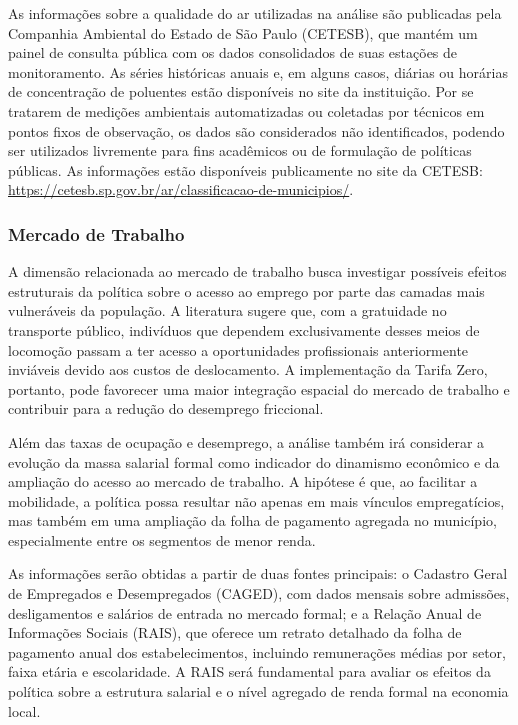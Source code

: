 As informações sobre a qualidade do ar utilizadas na análise são publicadas pela Companhia Ambiental do Estado de São Paulo (CETESB), que mantém um painel de consulta pública com os dados consolidados de suas estações de monitoramento. As séries históricas anuais e, em alguns casos, diárias ou horárias de concentração de poluentes estão disponíveis no site da instituição. Por se tratarem de medições ambientais automatizadas ou coletadas por técnicos em pontos fixos de observação, os dados são considerados não identificados, podendo ser utilizados livremente para fins acadêmicos ou de formulação de políticas públicas. As informações estão disponíveis publicamente no site da CETESB: \url{https://cetesb.sp.gov.br/ar/classificacao-de-municipios/}.

\subsubsection{Mercado de Trabalho}
A dimensão relacionada ao mercado de trabalho busca investigar possíveis efeitos estruturais da política sobre o acesso ao emprego por parte das camadas mais vulneráveis da população. A literatura sugere que, com a gratuidade no transporte público, indivíduos que dependem exclusivamente desses meios de locomoção passam a ter acesso a oportunidades profissionais anteriormente inviáveis devido aos custos de deslocamento. A implementação da Tarifa Zero, portanto, pode favorecer uma maior integração espacial do mercado de trabalho e contribuir para a redução do desemprego friccional.

Além das taxas de ocupação e desemprego, a análise também irá considerar a evolução da massa salarial formal como indicador do dinamismo econômico e da ampliação do acesso ao mercado de trabalho. A hipótese é que, ao facilitar a mobilidade, a política possa resultar não apenas em mais vínculos empregatícios, mas também em uma ampliação da folha de pagamento agregada no município, especialmente entre os segmentos de menor renda.

As informações serão obtidas a partir de duas fontes principais: o Cadastro Geral de Empregados e Desempregados (CAGED), com dados mensais sobre admissões, desligamentos e salários de entrada no mercado formal; e a Relação Anual de Informações Sociais (RAIS), que oferece um retrato detalhado da folha de pagamento anual dos estabelecimentos, incluindo remunerações médias por setor, faixa etária e escolaridade. A RAIS será fundamental para avaliar os efeitos da política sobre a estrutura salarial e o nível agregado de renda formal na economia local. 

